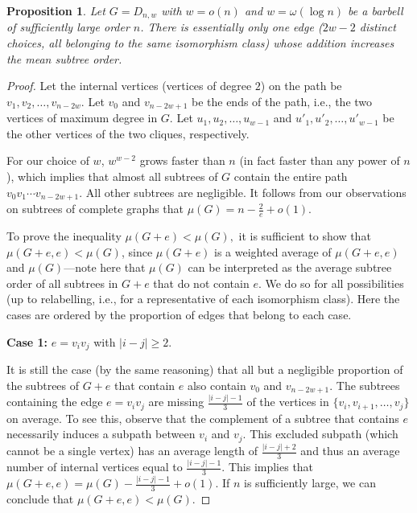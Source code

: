 \documentclass[11pt]{article}
\newtheorem{prop}[thr]{Proposition}
\theoremstyle{definition}
\newcommand*{\abs}[1]{\lvert #1\rvert}
\begin{document}
\begin{prop}
 Let $G=D_{n,w}$ with $w=o(n)$ and $w=\omega( \log n)$ be a barbell of sufficiently large order $n$.
 There is essentially only one edge ($2w-2$ distinct choices, all belonging to the same isomorphism class) whose addition increases the mean subtree order.
\end{prop}

\begin{proof}
 
 Let the internal vertices (vertices of degree $2$) on the path be $v_1, v_2, \ldots, v_{n-2w}.$ Let $v_0$ and $v_{n-2w+1}$ be the ends of the path, i.e., the two vertices of maximum degree in $G$.
 Let $u_1, u_2, \ldots, u_{w-1}$ and $u'_1, u'_2, \ldots, u'_{w-1}$ be the other vertices of the two cliques, respectively. 

For our choice of $w$, $w^{w-2}$ grows faster than $n$ (in fact faster than any power of $n$), which implies that almost all subtrees of $G$ contain the entire path $v_0v_1 \cdots v_{n-2w+1}$. All other subtrees are negligible. It follows from our observations on subtrees of complete graphs that $\mu(G) = n - \frac{2}{e} + o(1)$.

 To prove the inequality $\mu(G+e)<\mu(G),$ it is sufficient to show that $\mu(G+e,e)<\mu(G)$, since $\mu(G+e)$ is a weighted average of $\mu(G+e,e)$ and $\mu(G)$---note here that $\mu(G)$ can be interpreted as the average subtree order of all subtrees in $G+e$ that do not contain $e$.
 We do so for all possibilities (up to relabelling, i.e., for a representative of each isomorphism class). Here the cases are ordered by the proportion of edges that belong to each case.
 
 \textbf{Case 1:} $e=v_i v_j$ with $\abs{i-j}\ge 2.$
 
It is still the case (by the same reasoning) that all but a negligible proportion of the subtrees of $G+e$ that contain $e$ also contain $v_0$ and $v_{n-2w+1}$.  The subtrees containing the edge $e=v_i v_j$ are missing $\frac{\abs{i-j}-1}3$ of the vertices in $\{v_i, v_{i+1}, \ldots, v_{j}\}$ on average. To see this, observe that the complement of a subtree that contains $e$ necessarily induces a subpath between $v_i$ and $v_j$.
 This excluded subpath (which cannot be a single vertex) has an average length of $\frac{\abs{i-j}+2}3$ and thus an average number of internal vertices equal to $\frac{\abs{i-j}-1}3$.
 This implies that $\mu(G+e,e)=\mu(G)-\frac{\abs{i-j}-1}3+o(1)$. If $n$ is sufficiently large, we can conclude that $\mu(G+e,e)<\mu(G).$
 

\end{proof}
\end{document}
